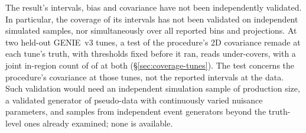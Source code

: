 
The result's intervals, bias and covariance have not been independently validated. In particular, the coverage of its intervals has not been validated on independent simulated samples, nor simultaneously over all reported bins and projections. At two held-out GENIE~v3 tunes, a test of the procedure's 2D covariance remade at each tune's truth, with thresholds fixed before it ran, reads under-covers, with a joint in-region count of  of  at both (\S\ref{sec:coverage-tunes}). The test concerns the procedure's covariance at those tunes, not the reported intervals at the data. Such validation would need an independent simulation sample of production size, a validated generator of pseudo-data with continuously varied nuisance parameters, and samples from independent event generators beyond the truth-level ones already examined; none is available.

